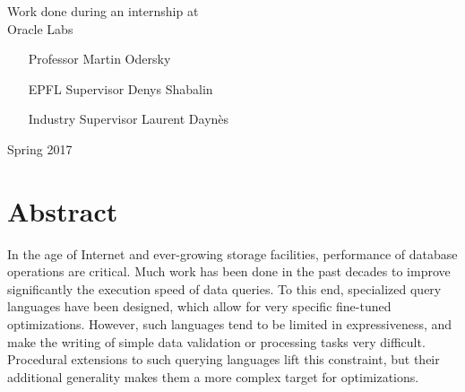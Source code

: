 \documentclass[twoside,11pt,a4paper]{article}
\begin{document}
\begin{titlepage}
\begin{center}
		\vfill       
		\normalsize
        Work done during an internship at\\
        \vspace{0.2cm}
        \Large Oracle Labs \large
        
        \vspace{0.3cm}
        
        
        
        
		\begin{itemize}
		\centering
		\item[Professor] Martin Odersky
		\item[EPFL Supervisor] Denys Shabalin
		\item[Industry Supervisor] Laurent Daynès
		\end{itemize}
        
	    \vspace{0.3cm}
    
		Spring 2017
		
	    \end{center}
	
\end{titlepage}

\cleardoublepage

\vspace*{1cm}
\section*{\hfil Abstract\hfil}
\label{sec:abstract}

\vspace{0.5cm}

In the age of Internet and ever-growing storage facilities, performance of database operations are critical. Much work has been done in the past decades to improve significantly the execution speed of data queries. To this end, specialized query languages have been designed, which allow for very specific fine-tuned optimizations. However, such languages tend to be limited in expressiveness, and make the writing of simple data validation or processing tasks very difficult. Procedural extensions to such querying languages lift this constraint, but their additional generality makes them a more complex target for optimizations.
\end{document}
